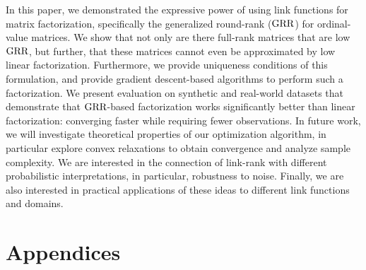 \documentclass{article}
\begin{document}
In this paper, we demonstrated the expressive power of using link functions for matrix factorization, specifically the generalized round-rank ($\text{GRR}$) for ordinal-value matrices.
We show that not only are there full-rank matrices that are low $\text{GRR}$, but further, that these matrices cannot even be approximated by low linear factorization. 
Furthermore, we provide uniqueness conditions of this formulation, and provide gradient descent-based algorithms to perform such a factorization. %
We present evaluation on synthetic and real-world datasets that demonstrate that $\text{GRR}$-based factorization works significantly better than linear factorization: converging faster while requiring fewer observations. %
In future work, 
we will investigate theoretical properties of our optimization algorithm, in particular explore convex relaxations to obtain convergence and analyze sample complexity.
We are interested in the connection of link-rank with different probabilistic interpretations, in particular, robustness to noise. %
Finally, we are also interested in practical applications of these ideas to different link functions and domains.







\newpage

\section*{Appendices}

\setcounter{section}{2}
\end{document}
